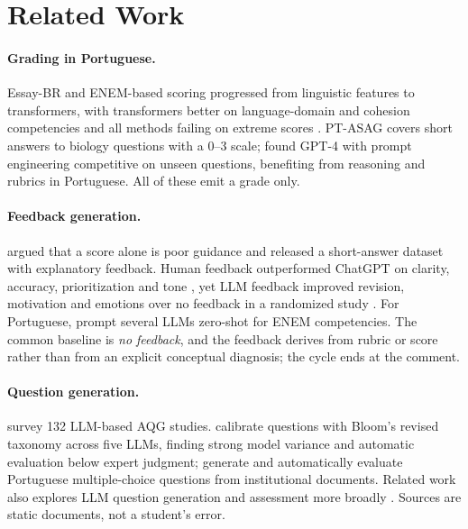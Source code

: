 \documentclass[11pt]{article}
\begin{document}
\section{Related Work}

\paragraph{Grading in Portuguese.} Essay-BR and ENEM-based scoring \citep{marinho2022} progressed from linguistic features to transformers, with transformers better on language-domain and cohesion competencies and all methods failing on extreme scores \citep{chalegre2026}. PT-ASAG \citep{galhardi2018} covers short answers to biology questions with a 0--3 scale; \citet{mello2025} found GPT-4 with prompt engineering competitive on unseen questions, benefiting from reasoning and rubrics in Portuguese. All of these emit a grade only.

\paragraph{Feedback generation.} \citet{filighera2022} argued that a score alone is poor guidance and released a short-answer dataset with explanatory feedback. Human feedback outperformed ChatGPT on clarity, accuracy, prioritization and tone \citep{steiss2024}, yet LLM feedback improved revision, motivation and emotions over no feedback in a randomized study \citep{meyer2024}. For Portuguese, \citet{anchieta2025} prompt several LLMs zero-shot for ENEM competencies. The common baseline is \emph{no feedback}, and the feedback derives from rubric or score rather than from an explicit conceptual diagnosis; the cycle ends at the comment.

\paragraph{Question generation.} \citet{oliveira2026} survey 132 LLM-based AQG studies. \citet{scaria2024} calibrate questions with Bloom's revised taxonomy \citep{anderson2001} across five LLMs, finding strong model variance and automatic evaluation below expert judgment; \citet{mucciaccia2025} generate and automatically evaluate Portuguese multiple-choice questions from institutional documents. Related work also explores LLM question generation and assessment more broadly \citep{maity2024,ehsan2025}. Sources are static documents, not a student's error.
\end{document}
